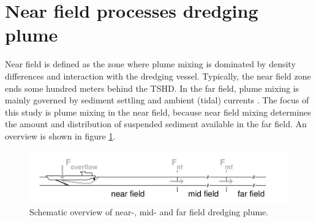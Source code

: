 
\section{Near field processes dredging plume}

\noindent %
Near field is defined as the zone where plume mixing is dominated by density differences and interaction with the dredging vessel. Typically, the near field zone ends some hundred meters behind the TSHD. In the far field, plume mixing is mainly governed by sediment settling and ambient (tidal) currents \citep{Dewit}. \newline The focus of this study is plume mixing in the near field, because near field mixing determines the amount and distribution of suspended sediment available in the far field. An overview is shown in figure \ref{fig:field}\citep{Dewit}.

\begin{figure}[ht!]
    \centering
    \includegraphics[width=1\linewidth]{Images/Nearfield_Midfield_Farfield.png}
    \caption{Schematic overview of near-, mid- and far field dredging plume. }
    \label{fig:field}
\end{figure}

